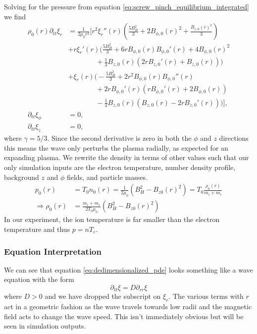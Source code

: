 Solving for the pressure from equation \ref{eq:screw_pinch_equilibrium_integrated} we find
\begin{align*}
  \rho_0(r) \partial_{tt} \xi_r &= \frac{1}{2 \mu_0 r^2} \bigg[ r^2 \xi_r''(r) \left(\frac{5 B_H^2}{3}+2 B_{\phi, 0}(r)^2+\frac{B_{z,0}(r)^2}{3}\right) \\
  & + r \xi_r'(r) \bigg(\frac{5 B_H^2}{3}+6 r B_{\phi, 0}(r) B_{\phi, 0}'(r)+4 B_{\phi, 0}(r)^2 \\
  &\qquad \qquad +\frac{1}{3} B_{z,0}(r) \left(2 r B_{z,0}'(r)+B_{z,0}(r)\right)\bigg) \\
  & + \xi_r(r) \bigg(-\frac{5 B_H^2}{3}+2 r^2 B_{\phi, 0}(r) B_{\phi, 0}''(r) \\
  & \qquad \qquad +2 r B_{\phi, 0}'(r) \left(r B_{\phi, 0}'(r)+2 B_{\phi, 0}(r)\right) \\
  & \qquad \qquad -\frac{1}{3} B_{z,0}(r) \left(B_{z,0}(r)-2 r B_{z,0}'(r)\right)\bigg) \bigg], \\
  \partial_{tt} \xi_\phi &= 0, \\
  \partial_{tt} \xi_z &= 0,
\end{align*}
where $\gamma = 5/3$. Since the second derivative is zero in both the $\phi$ and $z$ directions this means the wave only perturbs the plasma radially, as expected for an expanding plasma. We rewrite the density in terms of other values such that our only simulation inputs are the electron temperature, number density profile, background $z$ and $\phi$ fields, and particle masses.
\begin{align*}
  p_0(r) &= T_0 n_0(r) = \frac{1}{2 \mu_0}(B_H^2 - B_{z0}(r)^2) = T_0 \frac{\rho_0(r)}{m_i + m_e} \\
  \Rightarrow \rho_0(r) &= \frac{m_i + m_e}{2 T_0 \mu_0}(B_H^2 - B_{z0}(r)^2)
\end{align*}
In our experiment, the ion temperature is far smaller than the electron temperature and thus $p = n T_e$.

\subsubsection{Equation Interpretation}

We can see that equation \ref{eq:dedimensionalized_pde} looks something like a wave equation with the form
\begin{equation*}
    \partial_{tt} \xi = D \partial_{rr} \xi
\end{equation*}
where $D > 0$ and we have dropped the subscript on $\xi_r$. The various terms with $r$ act in a geometric fashion as the wave travels towards low radii and the magnetic field acts to change the wave speed. This isn't immediately obvious but will be seen in simulation outputs.

